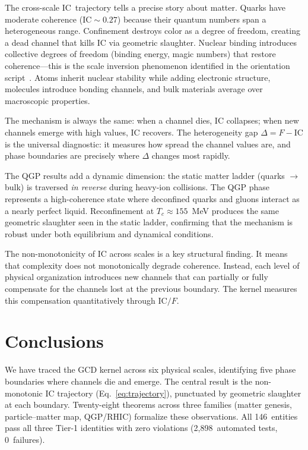 \documentclass[
  aps,
  prd,
  twocolumn,
  superscriptaddress,
  nofootinbib,
  floatfix
]{revtex4-2}
\newcommand{\IC}{\mathrm{IC}}
\begin{document}
The cross-scale $\IC$~trajectory tells a precise story about
matter.  Quarks have moderate coherence ($\IC \sim 0.27$)
because their quantum numbers span a heterogeneous range.
Confinement destroys color as a degree of freedom, creating
a dead channel that kills $\IC$ via geometric slaughter.
Nuclear binding introduces collective degrees of freedom
(binding energy, magic numbers) that restore coherence---this
is the scale inversion phenomenon identified in the orientation
script~\cite{paulus2025umcp}.  Atoms inherit nuclear stability
while adding electronic structure, molecules introduce bonding
channels, and bulk materials average over macroscopic properties.

The mechanism is always the same: when a channel dies, $\IC$
collapses; when new channels emerge with high values, $\IC$
recovers.  The heterogeneity gap $\Delta = F - \IC$ is the
universal diagnostic: it measures how spread the channel
values are, and phase boundaries are precisely where $\Delta$
changes most rapidly.

The QGP results add a dynamic dimension: the static matter
ladder (quarks $\to$ bulk) is traversed \emph{in reverse}
during heavy-ion collisions.  The QGP phase represents a
high-coherence state where deconfined quarks and gluons
interact as a nearly perfect liquid.  Reconfinement at
$T_c \approx 155$~MeV produces the same geometric slaughter
seen in the static ladder, confirming that the mechanism
is robust under both equilibrium and dynamical conditions.

The non-monotonicity of $\IC$ across scales is a key
structural finding.  It means that complexity does not
monotonically degrade coherence.  Instead, each level of
physical organization introduces new channels that can
partially or fully compensate for the channels lost at the
previous boundary.  The kernel measures this compensation
quantitatively through $\IC/F$.

\section{Conclusions}\label{sec:conclusions}

We have traced the GCD kernel across six physical scales,
identifying five phase boundaries where channels die and
emerge.  The central result is the non-monotonic $\IC$
trajectory (Eq.~\ref{eq:trajectory}), punctuated by
geometric slaughter at each boundary.  Twenty-eight theorems
across three families (matter genesis, particle--matter map,
QGP/RHIC) formalize these observations.  All 146~entities
pass all three Tier-1 identities with zero violations
(2{,}898~automated tests, 0~failures).
\end{document}
